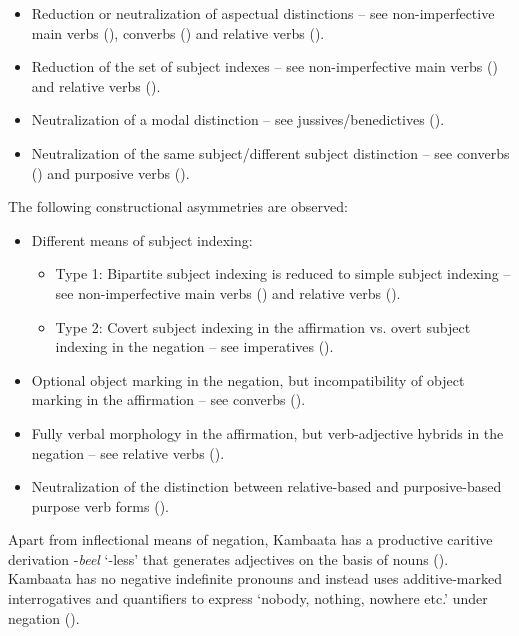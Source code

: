 \documentclass[output=paper,colorlinks,citecolor=brown,draftmode
]{langscibook}
\begin{document}
\begin{itemize}
  \item Reduction or neutralization of aspectual distinctions – see non-\hspace{0pt}imperfective main verbs (), converbs () and relative verbs ().
  \item Reduction of the set of subject indexes – see non-imperfective main verbs () and relative verbs ().
  \item Neutralization of a modal distinction – see jussives/\hspace{0pt}benedictives ().
  \item Neutralization of the same subject/\hspace{0pt}different subject distinction – see converbs () and purposive verbs ().
\end{itemize}

The following constructional asymmetries are observed:

\begin{itemize}
    \item Different means of subject indexing:
    \begin{itemize}
        \item Type 1: Bipartite subject indexing is reduced to simple subject indexing – see non-imperfective main verbs () and relative verbs ().
        \item Type 2: Covert subject indexing in the affirmation vs. overt subject indexing in the negation – see imperatives ().
    \end{itemize}
    \item Optional object marking in the negation, but incompatibility of object marking in the affirmation – see converbs ().
    \item Fully verbal morphology in the affirmation, but verb-adjective hybrids in the negation – see relative verbs ().
    \item Neutralization of the distinction between relative-based and purposive-based purpose verb forms ().
\end{itemize}

Apart from inflectional means of negation, Kambaata has a productive caritive derivation -\textit{beel} ‘-less’ that generates adjectives on the basis of nouns (). Kambaata has no negative indefinite pronouns and instead uses additive-marked interrogatives and quantifiers to express ‘nobody, nothing, nowhere etc.’ under negation ().
\end{document}
